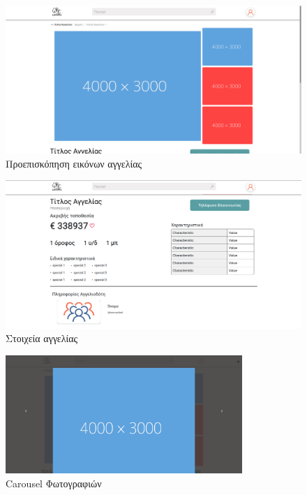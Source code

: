 \documentclass[manuscript,screen,review, language=greek, language=english]{acmart}
\begin{document}
	\begin{figure}[H]
		   \includegraphics[width=\textwidth]{listing_page1.png}
		   \caption{Προεπισκόπηση εικόνων αγγελίας}
		   \label{fig:listing_preview}
	\end{figure}

	\begin{figure}[H]
		   \includegraphics[width=\textwidth]{listing_page2.png}
		   \caption{Στοιχεία αγγελίας}
		   \label{fig:listing_info}
	\end{figure}

	\begin{figure}[H]
		   \includegraphics[width=0.8\textwidth]{listing_carousel.png}
		   \caption{Carousel Φωτογραφιών}
		   \label{fig:carousel}
	\end{figure}
\end{document}
